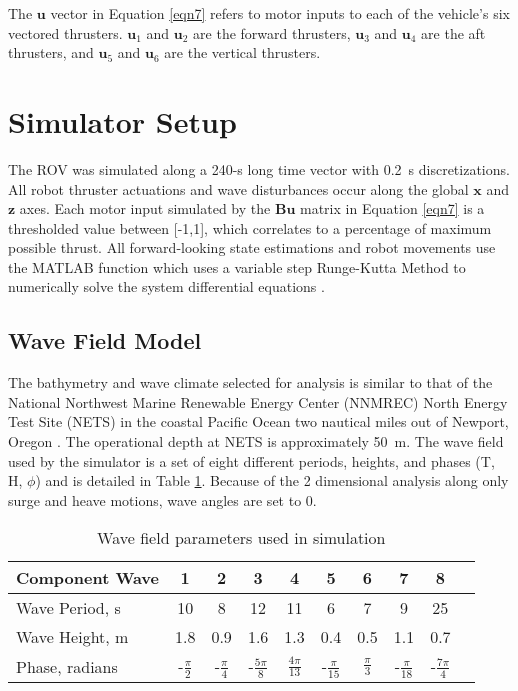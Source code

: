 \documentclass[letterpaper, 10pt, conference]{IEEEtran}
\renewcommand{\vec}[1]{\mathbf{#1}}
\begin{document}
The $\vec{u}$ vector in Equation \ref{eqn7} refers to motor inputs to each of the vehicle's six vectored thrusters. $\vec{u}_1$ and $\vec{u}_2$ are the forward thrusters, $\vec{u}_3$ and $\vec{u}_4$ are the aft thrusters, and $\vec{u}_5$ and $\vec{u}_6$ are the vertical thrusters.

\section{Simulator Setup}
\label{sec:sim}

The ROV was simulated along a 240-s long time vector with 0.2~s discretizations. All robot thruster actuations and wave disturbances occur along the global $\vec{x}$ and $\vec{z}$ axes. Each motor input simulated by the $\vec{B}\vec{u}$ matrix in Equation \ref{eqn7} is a thresholded value between [-1,1], which correlates to a percentage of maximum possible thrust. All forward-looking state estimations and robot movements use the MATLAB function  which uses a variable step Runge-Kutta Method to numerically solve the system differential equations \cite{ode45}.

\subsection{Wave Field Model} 

The bathymetry and wave climate selected for analysis is similar to that of the National Northwest Marine Renewable Energy Center (NNMREC) North Energy Test Site (NETS) in the coastal Pacific Ocean two nautical miles out of Newport, Oregon \cite{ling}. The operational depth at NETS is approximately 50~m. The wave field used by the simulator is a set of eight different periods, heights, and phases (T, H, $\phi$) and is detailed in Table \ref{table:waveData}. Because of the 2 dimensional analysis along only surge and heave motions, wave angles are set to 0.

\begin{table}
\caption{Wave field parameters used in simulation}
\begin{center}
\def\arraystretch{1.1}%
\begin{tabular}{ |l|c|c|c|c|c|c|c|c|c| } 
 \hline 
 Component Wave & 1 & 2 & 3 & 4 & 5 & 6 & 7 & 8 \\ 
 \hline
 Wave Period, s & 10 & 8 & 12 & 11 & 6 & 7 & 9 & 25  \\ 
 Wave Height, m & 1.8 & 0.9 & 1.6 & 1.3 & 0.4 & 0.5 & 1.1 & 0.7 \\ 
 Phase, radians & -$\frac{\pi}{2}$ & -$\frac{\pi}{4}$ & -$\frac{5\pi}{8}$ & $\frac{4\pi}{13}$ & -$\frac{\pi}{15}$ & $\frac{\pi}{3}$ & -$\frac{\pi}{18}$ & -$\frac{7\pi}{4}$\\
 \hline
\end{tabular}
\end{center}
\label{table:waveData}
\end{table}
\end{document}
